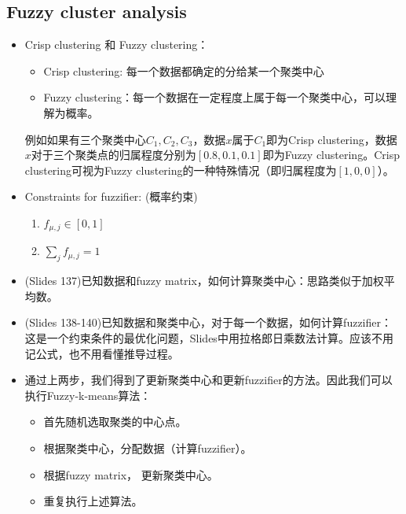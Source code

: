 \documentclass[12pt, a4paper, oneside]{ctexart}
\begin{document}
\subsection{Fuzzy cluster analysis}
\begin{itemize}
    \item Crisp clustering 和 Fuzzy clustering：
    \begin{itemize}
        \item Crisp clustering: 每一个数据都确定的分给某一个聚类中心
        \item Fuzzy clustering：每一个数据在一定程度上属于每一个聚类中心，可以理解为概率。
    \end{itemize}
    例如如果有三个聚类中心$C_1,C_2,C_3$，数据$x$属于$C_1$即为Crisp clustering，数据$x$对于三个聚类点的归属程度分别为$[0.8,0.1,0.1]$即为Fuzzy clustering。Crisp clustering可视为Fuzzy clustering的一种特殊情况（即归属程度为$[1,0,0]$）。

    \item Constraints for fuzzifier: (概率约束)
    \begin{enumerate}
        \item $f_{\mu,j} \in [0,1]$
        \item $\sum_j f_{\mu,j}=1$
    \end{enumerate}

    \item (Slides 137)已知数据和fuzzy matrix，如何计算聚类中心：思路类似于加权平均数。
    \item (Slides 138-140)已知数据和聚类中心，对于每一个数据，如何计算fuzzifier：这是一个约束条件的最优化问题，Slides中用拉格郎日乘数法计算。应该不用记公式，也不用看懂推导过程。
    \item 通过上两步，我们得到了更新聚类中心和更新fuzzifier的方法。因此我们可以执行Fuzzy-k-means算法：
    \begin{itemize}
        \item 首先随机选取聚类的中心点。
        \item 根据聚类中心，分配数据（计算fuzzifier）。
        \item 根据fuzzy matrix， 更新聚类中心。
        \item 重复执行上述算法。
    \end{itemize}
\end{itemize}
\end{document}
